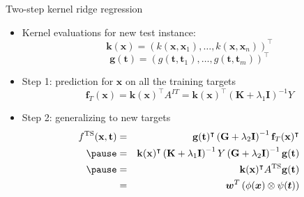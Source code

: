 \documentclass[]{beamer}
\newcommand{\osize}{n}
\newcommand{\kernelf}{k}
\newcommand{\gkernelf}{g}
\newcommand{\dkernelm}{\bm{K}}
\newcommand{\tkernelm}{\bm{G}}
\newcommand{\regparam}{\lambda}
\newcommand{\idmatrix}{\bm{I}}
\newcommand{\transpose}{^\intercal}
\newcommand{\bm}[1]{\mathbf{#1}}
\newcommand{\predfun}{f}
\newcommand{\taskset}{T}
\renewcommand{\vec}[1]{\boldsymbol{#1}}
\begin{document}
\begin{frame}{Two-step kernel ridge regression}

\vspace{0.6cm}
\begin{itemize}
\item Kernel evaluations for new test instance: 
$$\bm{k}(\bm{x})=\left(\kernelf(\bm{x},\bm{x}_1),\ldots,\kernelf(\bm{x},\bm{x}_\osize)\right)\transpose$$ 
$$\bm{g}(\bm{t})=\left(\gkernelf(\bm{t},\bm{t}_1),\ldots,\gkernelf(\bm{t},\bm{t}_m)\right)\transpose$$ \pause 
\item Step 1: prediction for $\bm{x}$ on all the training targets
$$
\mathbf{\predfun}_\taskset (\bm{x}) = \bm{k}(\bm{x})\transpose A^{IT} = \bm{k}(\bm{x})\transpose \left(\dkernelm+\regparam_1 \idmatrix\right)^{-1} Y  $$ \pause 
\item Step 2: generalizing to new targets
\begin{eqnarray*}
\predfun^\text{TS}(\bm{x}, \bm{t}) &=&  \bm{g}(\bm{t})\transpose \left(\tkernelm+\regparam_2 \idmatrix\right)^{-1}  \mathbf{\predfun}_\taskset (\bm{x})\transpose \\ \pause 
&=& \bm{k}(\bm{x})\transpose \left(\dkernelm+\regparam_1 \idmatrix\right)^{-1} Y  \left(\tkernelm+\regparam_2 \idmatrix\right)^{-1} \bm{g}(\bm{t}) \\ \pause 
&=& \bm{k}(\bm{x})\transpose A^\text{TS} \bm{g}(\bm{t}) \\
&=& \vec{w}^T \left(\phi(\vec{x}) \otimes \psi(\vec{t}) \right)
\end{eqnarray*}
\end{itemize}
\end{frame}


%
%
%
\end{document}
